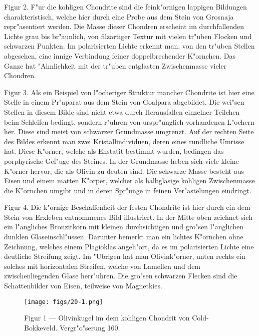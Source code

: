 \documentclass[a4paper, 11pt, oneside, polutonikogreek, german]{article}
\begin{document}
Figur 2. F"ur die kohligen Chondrite sind die feink"ornigen lappigen Bildungen charakteristisch, welche hier durch eine Probe aus dem Stein von Grosnaja repr"asentiert werden. Die Masse dieser Chondren erscheint im durchfallenden Lichte grau bis br"aunlich, von filzartiger Textur mit vielen tr"uben Flocken und schwarzen Punkten. Im polarisierten Lichte erkennt man, von den tr"uben Stellen abgesehen, eine innige Verbindung feiner doppelbrechender K"ornchen. Das Ganze hat "Ahnlichkeit mit der tr"uben entglasten Zwischenmasse vieler Chondren.

Figur 3. Als ein Beispiel von l"ocheriger Struktur mancher Chondrite ist hier eine Stelle in einem Pr"aparat aus dem Stein von Goalpara abgebildet. Die wei"sen Stellen in diesem Bilde sind nicht etwa durch Herausfallen einzelner Teilchen beim Schleifen bedingt, sondern r"uhren von urspr"unglich vorhandenen L"ochern her. Diese sind meist von schwarzer Grundmasse umgrenzt. Auf der rechten Seite des Bildes erkennt man zwei Kristallindividuen, deren eines rundliche Umrisse hat. Diese K"orner, welche als Enstatit bestimmt wurden, bedingen das porphyrische Gef"uge des Steines. In der Grundmasse heben sich viele kleine K"orner hervor, die als Olivin zu deuten sind. Die schwarze Masse besteht aus Eisen und einem matten K"orper, welcher als halbglasige kohligen Zwischenmasse die K"ornchen umgibt und in deren Spr"unge in feinen Ver"astelungen eindringt.

Figur 4. Die k"ornige Beschaffenheit der festen Chondrite ist hier durch ein dem Stein von Erxleben entnommenes Bild illustriert. In der Mitte oben zeichnet sich ein l"angliches Bronzitkorn mit kleinen durchsichtigen und gro"sen l"anglichen dunklen Glaseinschl"ussen. Darunter bemerkt man ein lichtes K"ornchen ohne Zeichnung, welches einem Plagioklas angeh"ort, da es im polarisierten Lichte eine deutliche Streifung zeigt. Im "Ubrigen hat man Olivink"orner, unten rechts ein solches mit horizontalen Streifen, welche von Lamellen und dem zwischenliegenden Glase herr"uhren. Die gro"sen schwarzen Flecken sind die Schattenbilder von Eisen, teilweise von Magnetkies.
\clearpage

\vspace*{\fill}
\begin{figure}[H]
\centering
\texttt{[image: figs/20-1.png]}
\caption{\small Figur 1 --- Olivinkugel im dem kohligen Chondrit von Cold-Bokkeveld. Vergr"o"serung 160.}
\end{figure}
\vspace*{\fill}
\clearpage
\end{document}
